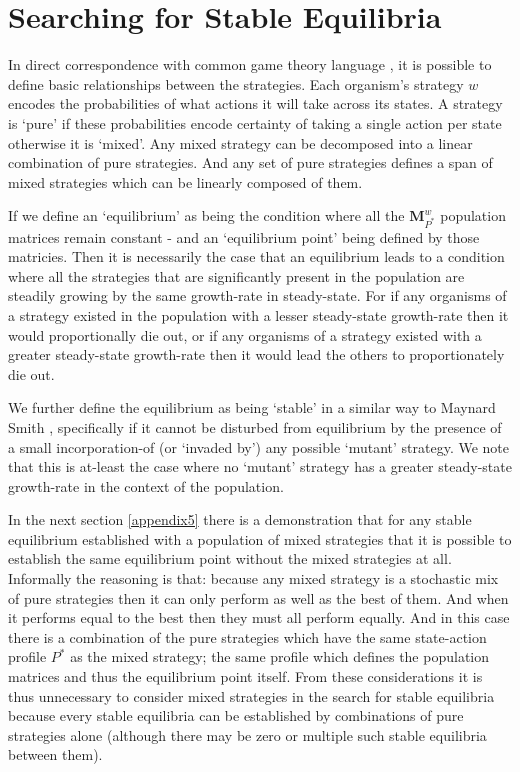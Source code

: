 \section{Searching for Stable Equilibria}\label{sec:equilibria}

In direct correspondence with common game theory language \cite{weibull}, it is possible to define basic relationships between the strategies.
Each organism's strategy $w$ encodes the probabilities of what actions it will take across its states.  A strategy is `pure' if these probabilities encode certainty of taking a single action per state otherwise it is `mixed'. Any mixed strategy can be decomposed into a linear combination of pure strategies. And any set of pure strategies defines a span of mixed strategies which can be linearly composed of them.

If we define an `equilibrium' as being the condition where all the $\mathbf{M}_{P^*}^w$ population matrices remain constant - and an `equilibrium point' being defined by those matricies.
Then it is necessarily the case that an equilibrium leads to a condition where all the strategies that are significantly present in the population are steadily growing by the same growth-rate in steady-state. For if any organisms of a strategy existed in the population with a lesser steady-state growth-rate then it would proportionally die out, or if any organisms of a strategy existed with a greater steady-state growth-rate then it would lead the others to proportionately die out.

We further define the equilibrium as being `stable' in a similar way to Maynard Smith \cite{maynard, maynard2, weibull}, specifically if it cannot be disturbed from equilibrium by the presence of a small incorporation-of (or `invaded by') any possible `mutant' strategy. We note that this is at-least the case where no `mutant' strategy has a greater steady-state growth-rate in the context of the population.

In the next section \ref{appendix5} there is a demonstration that for any stable equilibrium established with a population of mixed strategies that it is possible to establish the same equilibrium point without the mixed strategies at all.
Informally the reasoning is that: because any mixed strategy is a stochastic mix of pure strategies then it can only perform as well as the best of them. And when it performs equal to the best then they must all perform equally. And in this case there is a combination of the pure strategies which have the same state-action profile $P^*$ as the mixed strategy; the same profile which defines the population matrices and thus the equilibrium point itself.
From these considerations it is thus unnecessary to consider mixed strategies in the search for stable equilibria because every stable equilibria can be established by combinations of pure strategies alone (although there may be zero or multiple such stable equilibria between them).

